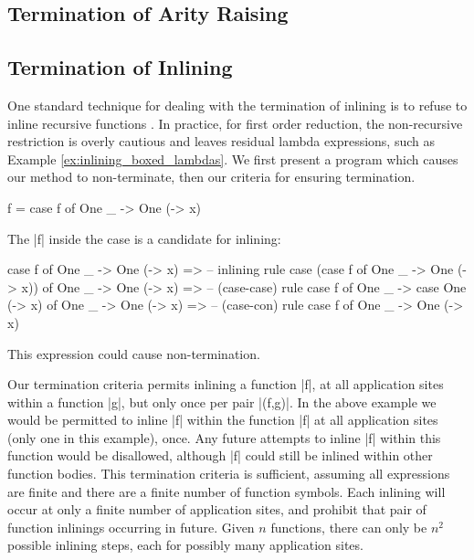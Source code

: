\documentclass[preprint]{sigplanconf}
\begin{document}
\subsection{Termination of Arity Raising}


\subsection{Termination of Inlining}

One standard technique for dealing with the termination of inlining is to refuse to inline recursive functions \cite{spj:inlining}. In practice, for first order reduction, the non-recursive restriction is overly cautious and leaves residual lambda expressions, such as Example \ref{ex:inlining_boxed_lambdas}. We first present a program which causes our method to non-terminate, then our criteria for ensuring termination.

\begin{example}
\begin{code}
f = case  f of
          One _ -> One (\x -> x)
\end{code}

The |f| inside the case is a candidate for inlining:

\ignore\begin{code}
case f of One _ -> One (\x -> x)
    => -- inlining rule
case (case f of One _ -> One (\x -> x)) of One _ -> One (\x -> x)
    => -- (case-case) rule
case f of One _ -> case One (\x -> x) of One _ -> One (\x -> x)
    => -- (case-con) rule
case f of One _ -> One (\x -> x)
\end{code}

This expression could cause non-termination.
\end{example}

Our termination criteria permits inlining a function |f|, at all application sites within a function |g|, but only once per pair |(f,g)|. In the above example we would be permitted to inline |f| within the function |f| at all application sites (only one in this example), once. Any future attempts to inline |f| within this function would be disallowed, although |f| could still be inlined within other function bodies. This termination criteria is sufficient, assuming all expressions are finite and there are a finite number of function symbols. Each inlining will occur at only a finite number of application sites, and prohibit that pair of function inlinings occurring in future. Given $n$ functions, there can only be $n^2$ possible inlining steps, each for possibly many application sites.
\end{document}
